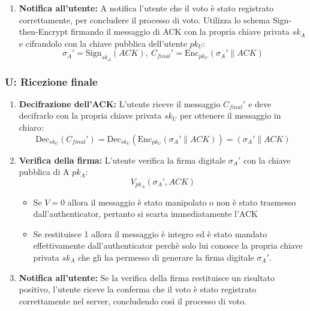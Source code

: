 \begin{enumerate}
			\item \textbf{Notifica all'utente:} A notifica l'utente che il voto è stato registrato correttamente, per concludere il processo di voto. Utilizza lo schema Sign-then-Encrypt firmando il messaggio di ACK con la propria chiave privata $sk_A$ e cifrandolo con la chiave pubblica dell'utente $pk_U$:
			$$ \sigma_A' = \text{Sign}_{sk_A}(ACK),\ C_{final}' = \text{Enc}_{pk_U}(\sigma_A' \| ACK) $$
		\end{enumerate}

	\subsubsection{U: Ricezione finale}
		\begin{enumerate}
			\item \textbf{Decifrazione dell'ACK:} L'utente riceve il messaggio $C_{final}'$ e deve decifrarlo con la propria chiave privata $sk_U$ per ottenere il messaggio in chiaro:
			$$ \text{Dec}_{sk_U}(C_{final}') = \text{Dec}_{sk_U}(\text{Enc}_{pk_U}(\sigma_A' \| ACK)) = \boxed{(\sigma_A' \| ACK)} $$
			
			\item \textbf{Verifica della firma:} L'utente verifica la firma digitale $\sigma_A'$ con la chiave pubblica di A $pk_A$:
			$$ V_{pk_A}(\sigma_A', ACK) $$
			\begin{itemize}
				\item Se $V=0$ allora il messaggio è stato manipolato o non è stato trasmesso dall'authenticator, pertanto si scarta immediatamente l'ACK
				
				\item Se restituisce 1 allora il messaggio è integro ed è stato mandato effettivamente dall'authenticator perchè solo lui conosce la propria chiave privata $sk_A$ che gli ha permesso di generare la firma digitale $\sigma_A'$.
			\end{itemize}
			
			\item \textbf{Notifica all'utente:} Se la verifica della firma restituisce un risultato positivo, l'utente riceve la conferma che il voto è stato registrato correttamente nel server, concludendo così il processo di voto.
		\end{enumerate}
	

